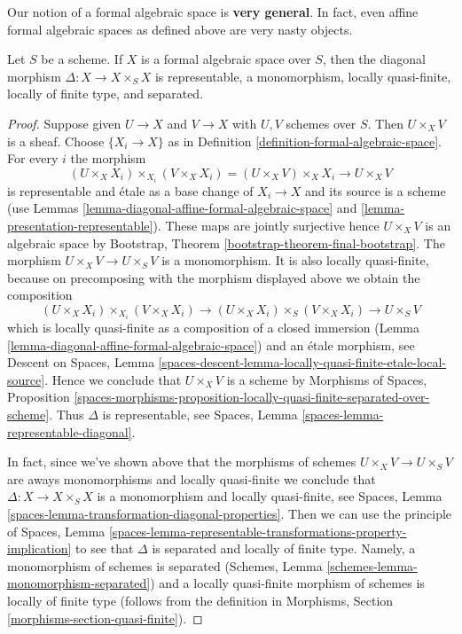 \medskip\noindent
Our notion of a formal algebraic space is {\bf very general}.
In fact, even affine formal algebraic spaces as defined above
are very nasty objects.

\begin{lemma}
\label{lemma-diagonal-formal-algebraic-space}
Let $S$ be a scheme. If $X$ is a formal algebraic space over
$S$, then the diagonal morphism $\Delta : X \to X \times_S X$
is representable, a monomorphism, locally quasi-finite,
locally of finite type, and separated.
\end{lemma}

\begin{proof}
Suppose given $U \to X$ and $V \to X$ with $U, V$ schemes over $S$.
Then $U \times_X V$ is a sheaf. Choose $\{X_i \to X\}$ as in
Definition \ref{definition-formal-algebraic-space}.
For every $i$ the morphism
$$
(U \times_X X_i) \times_{X_i} (V \times_X X_i)
= (U \times_X V) \times_X X_i \to U \times_X V
$$
is representable and \'etale as a base change of $X_i \to X$
and its source is a scheme (use
Lemmas \ref{lemma-diagonal-affine-formal-algebraic-space} and
\ref{lemma-presentation-representable}). These maps are jointly surjective
hence $U \times_X V$ is an algebraic space by
Bootstrap, Theorem \ref{bootstrap-theorem-final-bootstrap}.
The morphism $U \times_X V \to U \times_S V$ is a monomorphism.
It is also locally quasi-finite, because on precomposing with
the morphism displayed above we obtain the composition
$$
(U \times_X X_i) \times_{X_i} (V \times_X X_i)
\to (U \times_X X_i) \times_S (V \times_X X_i)
\to U \times_S V
$$
which is locally quasi-finite as a composition of a closed
immersion (Lemma \ref{lemma-diagonal-affine-formal-algebraic-space})
and an \'etale morphism, see
Descent on Spaces, Lemma
\ref{spaces-descent-lemma-locally-quasi-finite-etale-local-source}.
Hence we conclude that $U \times_X V$ is a scheme by
Morphisms of Spaces, Proposition
\ref{spaces-morphisms-proposition-locally-quasi-finite-separated-over-scheme}.
Thus $\Delta$ is representable, see
Spaces, Lemma \ref{spaces-lemma-representable-diagonal}.

\medskip\noindent
In fact, since we've shown above that the morphisms of schemes
$U \times_X V \to U \times_S V$ are aways monomorphisms and
locally quasi-finite we conclude that $\Delta : X \to X \times_S X$
is a monomorphism and locally quasi-finite, see
Spaces, Lemma \ref{spaces-lemma-transformation-diagonal-properties}.
Then we can use the principle of
Spaces, Lemma
\ref{spaces-lemma-representable-transformations-property-implication}
to see that $\Delta$ is separated and locally of finite type.
Namely, a monomorphism of schemes is separated
(Schemes, Lemma \ref{schemes-lemma-monomorphism-separated})
and a locally quasi-finite morphism of schemes is
locally of finite type
(follows from the definition in
Morphisms, Section \ref{morphisms-section-quasi-finite}).
\end{proof}

